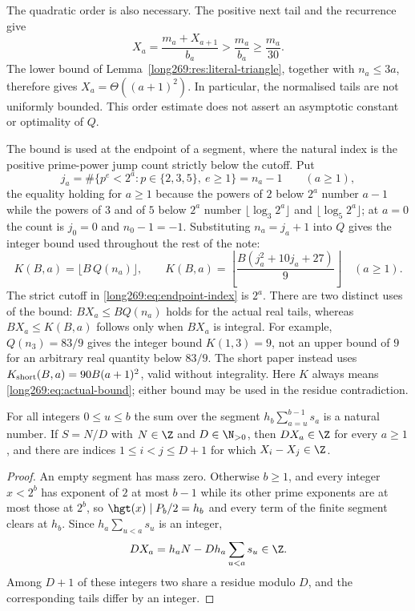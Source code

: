 The quadratic order is also necessary.  The positive next tail and the
recurrence give
\[
 X_a=\frac{m_a+X_{a+1}}{b_a}>\frac{m_a}{b_a}\ge\frac{m_a}{30}.
\]
The lower bound of Lemma~\ref{long269:res:literal-triangle}, together
with $n_a\le3a$, therefore gives $X_a=\Theta((a+1)^2)$.  In particular,
the normalised tails are not uniformly bounded.  This order estimate
does not assert an asymptotic constant or optimality of $Q$.

The bound is used at the endpoint of a segment, where the natural index is the
positive prime-power jump count strictly below the cutoff.  Put
\begin{equation}\label{long269:eq:endpoint-index}
 j_a=\#\{p^{e}<2^{a}:p\in\{2,3,5\},\ e\ge1\}=n_a-1\qquad(a\ge1),
\end{equation}
the equality holding for $a\ge1$ because the powers of $2$ below $2^{a}$ number
$a-1$ while the powers of $3$ and of $5$ below $2^{a}$ number
$\lfloor\log_3 2^{a}\rfloor$ and $\lfloor\log_5 2^{a}\rfloor$; at $a=0$ the
count is $j_0=0$ and $n_0-1=-1$.  Substituting $n_a=j_a+1$ into $Q$ gives the
integer bound used throughout the rest of the note:
\begin{equation}\label{long269:eq:actual-bound}
 K(B,a)=\bigl\lfloor B\,Q(n_a)\bigr\rfloor,
 \qquad
 K(B,a)=\left\lfloor\frac{B(j_a^{2}+10j_a+27)}9\right\rfloor\quad(a\ge1).
\end{equation}
The strict cutoff in \eqref{long269:eq:endpoint-index} is $2^a$.
There are two distinct uses of the bound: $BX_a\le BQ(n_a)$ holds for the
actual real tails, whereas $BX_a\le K(B,a)$ follows only when $BX_a$
is integral. For example, $Q(n_3)=83/9$ gives the integer bound
$K(1,3)=9$, not an upper bound of $9$ for an arbitrary real quantity
below $83/9$. The short paper instead uses
$K_{\rm short}(B,a)=90B(a+1)^2$, valid without integrality. Here $K$
always means \eqref{long269:eq:actual-bound}; either bound may be used
in the residue contradiction.



\begin{lemma}\label{long269:res:all-scale-lattice}
For all integers $0\le u\le b$ the sum over the segment $h_b\sum_{a=u}^{b-1}s_a$ is a
natural number.  If $S=N/D$ with $N\in\Z$ and $D\in\N_{>0}$, then $DX_a\in\Z$
for every $a\ge1$, and there are indices $1\le i<j\le D+1$ for which
$X_i-X_j\in\Z$.
\end{lemma}

\begin{proof}
An empty segment has mass zero.  Otherwise $b\ge1$, and every integer $x<2^{b}$
has exponent of $2$ at most $b-1$ while its other prime exponents are at
most those at $2^{b}$, so $\hgt(x)\mid P_b/2=h_b$ and every term of the
finite segment clears at $h_b$.  Since $h_a\sum_{u<a}s_u$ is an integer,
\[
 DX_a=h_aN-Dh_a\sum_{u<a}s_u\in\Z.
\]
Among $D+1$ of these integers two share a residue
modulo $D$, and the corresponding tails differ by an integer.
\end{proof}

